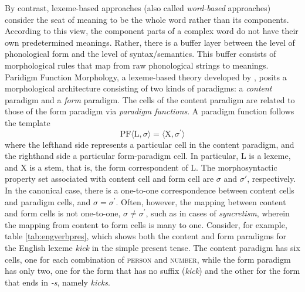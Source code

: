 By contrast, lexeme-based approaches (also called \emph{word-based} 
approaches) consider the seat of meaning to be the whole word rather than its components. According to this view, the component 
parts of a complex word do not have their own predetermined meanings. 
Rather, 
there is a buffer layer between the level of phonological form and the level of
syntax/semantics. This
buffer consists of morphological rules that map from raw phonological 
strings to meanings.
Paridigm Function Morphology, a lexeme-based theory developed by \citet{stump:2001}, 
posits a morphological architecture consisting of two kinds of paradigms: a \emph{content} paradigm and a \emph{form} paradigm.
The cells of the content paradigm are related to those of the form paradigm via
\emph{paradigm functions}.
A paradigm function follows the template
\begin{equation}
\label{eq:PF}
	\text{PF}\langle \text{L},\sigma \rangle = \langle \text{X}, \sigma^\prime \rangle
\end{equation}
where the lefthand side represents a particular cell in the 
content paradigm, and the righthand side a particular form-paradigm cell.
In particular, $\text{L}$ is a lexeme, and $\text{X}$ is a stem, that is, the form correspondent of $\text{L}$. 
The morphosyntactic property set associated with content cell and form cell are $\sigma$ and 
$\sigma\prime$, respectively. In the canonical case, there is a one-to-one
correspondence between content cells and paradigm cells, and 
$\sigma = \sigma^\prime$.
Often, however, the mapping between content and form cells is 
not one-to-one, $\sigma \ne \sigma^\prime$, such as in cases of
\emph{syncretism}, wherein the mapping from content to form cells is many to one. 
Consider, for example, table 
\ref{tab:engverbpres}, which shows both the content and form paradigms 
for the English lexeme \emph{kick} in the simple present tense.
The content paradigm has six cells, one for each combination of \textsc{person} 
and \textsc{number}, while the form paradigm has only two, one for the 
form that has no suffix (\textit{kick}) and the other for the form 
that ends in \textit{-s}, namely \textit{kicks}. 
 
